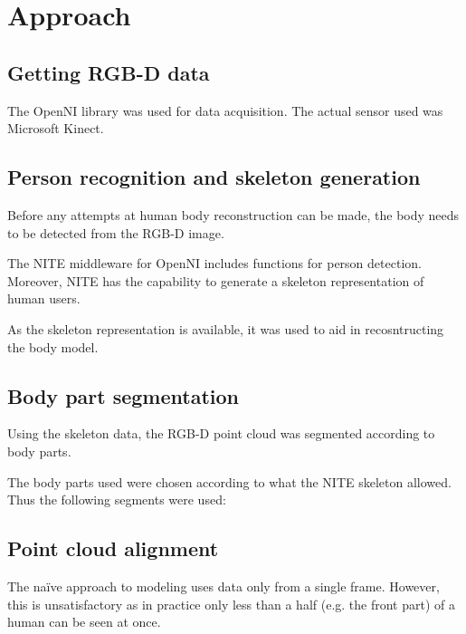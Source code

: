 \chapter{Approach}

\section{Getting RGB-D data}


The OpenNI library \citep{OpenNI}
was used for data acquisition. The actual sensor used was Microsoft Kinect.

\section{Person recognition and skeleton generation}

Before any attempts at human body reconstruction can be made, the body needs to be detected from the RGB-D image. 

The NITE middleware for OpenNI \citep{NITE}
includes functions for person detection. Moreover, NITE has the capability to generate a skeleton representation of human users.

As the skeleton representation is available, it was used to aid in recosntructing the body model.

\section{Body part segmentation}

Using the skeleton data, the RGB-D point cloud was segmented according to body parts.

The body parts used were chosen according to what the NITE skeleton allowed. Thus the following segments were used:


\section{Point cloud alignment}

The naïve approach to modeling uses data only from a single frame. However, this is unsatisfactory as in practice only less than a half (e.g. the front part) of a human can be seen at once.

